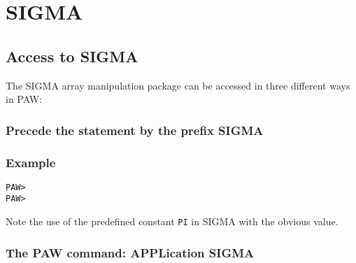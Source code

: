 
\chapter{SIGMA}
\label{chap-sigma}
\def\PAWchap{SIGMA}

\section{Access to SIGMA}
\label{sec:H2SIGMA}
 
The SIGMA array manipulation package can be 
accessed in three different ways in PAW:

\subsection*{Precede the statement by the prefix SIGMA}
 
\subsection*{Example}
\begin{alltt}
  PAW > 
  PAW > 
\end{alltt}
Note the use of the predefined constant \texttt{PI}
in SIGMA with the obvious value.

\subsection*{The PAW command: APPLication SIGMA}
 
